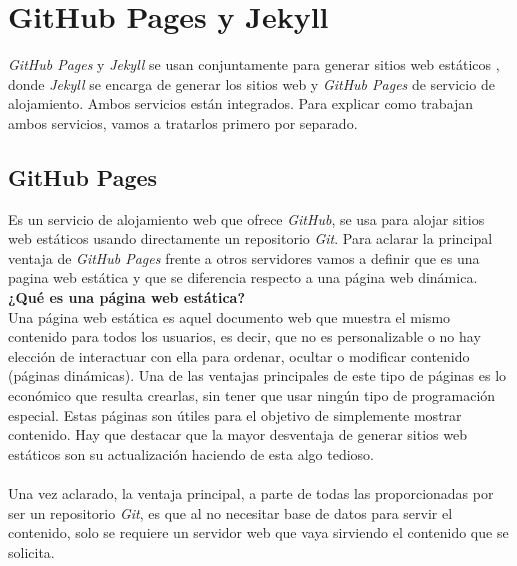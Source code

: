 \documentclass[a4paper, 12pt]{book}
\begin{document}
\section{GitHub Pages y Jekyll}
\label{sec:githubJekyll}
\emph{GitHub Pages} y \emph{Jekyll} se usan conjuntamente para generar sitios web estáticos , donde \emph{Jekyll} se encarga de generar los sitios web y \emph{GitHub Pages} de servicio de alojamiento. Ambos servicios están integrados. Para explicar como trabajan ambos servicios, vamos a tratarlos primero por separado.

\subsection{GitHub Pages}
\label{subsec:githubpages}
Es un servicio de alojamiento web que ofrece \emph{GitHub}, se usa para alojar sitios web estáticos usando directamente un repositorio \emph{Git}. Para aclarar la principal ventaja de \emph{GitHub Pages} frente a otros servidores vamos a definir que es una pagina web estática y que se diferencia respecto a una página web dinámica. \\
\textbf{¿Qué es una página web estática?}\\
Una página web estática es aquel documento web que muestra el mismo contenido para todos los usuarios, es decir, que no es personalizable o no hay elección de interactuar con ella para ordenar, ocultar o modificar contenido (páginas dinámicas). Una de las ventajas principales de este tipo de páginas es lo económico que resulta crearlas, sin tener que usar ningún tipo de programación especial. Estas páginas son útiles para el objetivo de simplemente mostrar contenido. Hay que destacar que la mayor desventaja de generar sitios web estáticos son su actualización haciendo de esta algo tedioso. \\ \\
Una vez aclarado, la ventaja principal, a parte de todas las proporcionadas por ser un repositorio \emph{Git}, es que al no necesitar base de datos para servir el contenido, solo se requiere un servidor web que vaya sirviendo el contenido que se solicita.
\end{document}
